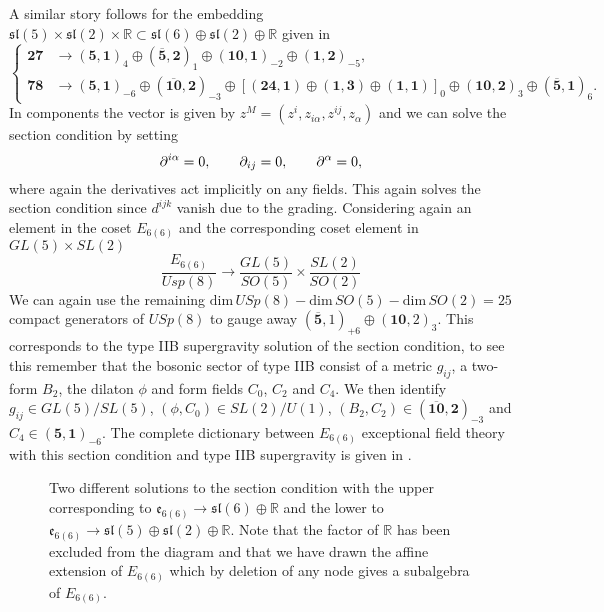 A similar story follows for the embedding $\mathfrak{sl}(5)\times \mathfrak{sl}(2)\times\mathbb{R}\subset \mathfrak{sl}(6)\oplus\mathfrak{sl}(2)\oplus\mathbb{R}$ given in  
\begin{equation}
    \begin{cases}
        \mathbf{27}&\to (\mathbf{5},\mathbf{1})_{4}\oplus (\overbar{\mathbf{5}},\mathbf{2})_{1}\oplus (\mathbf{10},\mathbf{1})_{-2}\oplus (\mathbf{1},\mathbf{2})_{-5},\\
        \mathbf{78}&\to (\mathbf{5},\mathbf{1})_{-6}\oplus (\overbar{\mathbf{10}},\mathbf{2})_{-3}\oplus [(\mathbf{24},\mathbf{1})\oplus (\mathbf{1},\mathbf{3})\oplus (\mathbf{1},\mathbf{1})]_{0}\oplus (\mathbf{10},\mathbf{2})_{3}\oplus (\overbar{\mathbf{5}},\mathbf{1})_{6}.
    \end{cases}
\end{equation}
In components the vector is given by $z^M=(z^{i},z_{i\alpha},z^{ij},z_{\alpha})$ and we can solve the section condition by setting
\begin{equation}
    \partial^{i\alpha}=0,\qquad \partial_{ij}=0,\qquad \partial^{\alpha} = 0,
\end{equation}
where again the derivatives act implicitly on any fields.  This again solves the section condition since $d^{ijk}$ vanish due to the grading. Considering again an element in the coset $E_{6(6)}$ and the corresponding coset element in $GL(5)\times SL(2)$
\begin{equation}
    \frac{E_{6(6)}}{Usp(8)}\to \frac{GL(5)}{SO(5)}\times\frac{SL(2)}{SO(2)}
\end{equation}
We can again use the remaining $\text{dim}\, USp(8)-\text{dim}\, SO(5)-\text{dim}\, SO(2)=25$ compact generators of $USp(8)$ to gauge away $(\overbar{\mathbf{5}},1)_{+6}\oplus(\mathbf{10},2)_{3}$. This corresponds to the type IIB supergravity solution of the section condition, to see this remember that the bosonic sector of type IIB consist of a metric $g_{ij}$, a two-form $B_2$, the dilaton $\phi$ and form fields $C_0$, $C_2$ and $C_4$. We then identify $g_{ij}\in GL(5)/SL(5)$, $(\phi,C_0)\in SL(2)/U(1)$, $(B_2,C_2)\in (\overbar{\mathbf{10}},\mathbf{2})_{-3}$ and $C_4\in (\mathbf{5},\mathbf{1})_{-6}$. The complete dictionary between $E_{6(6)}$ exceptional field theory with this section condition and type IIB supergravity is given in \cite{E62014}. 


\begin{figure}
    \centering
    \caption{Two different solutions to the section condition with the upper corresponding to $\mathfrak{e}_{6(6)}\to \mathfrak{sl}(6)\oplus\mathbb{R}$ and the lower to $\mathfrak{e}_{6(6)}\to\mathfrak{sl}(5)\oplus\mathfrak{sl}(2)\oplus\mathbb{R}$. Note that the factor of $\mathbb{R}$ has been excluded from the diagram and that we have drawn the affine extension of $E_{6(6)}$ which by deletion of any node gives a subalgebra of $E_{6(6)}$.}
    \label{fig:E6Section}
\end{figure}

